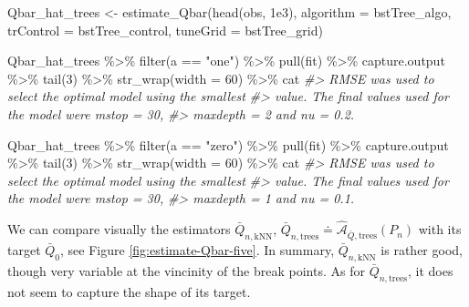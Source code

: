 \documentclass[
  11pt,
  openright,twoside]{book}
\newenvironment{Shaded}{\begin{snugshade}}{\end{snugshade}}
\newcommand{\AttributeTok}[1]{\textcolor[rgb]{0.77,0.63,0.00}{#1}}
\newcommand{\CommentTok}[1]{\textcolor[rgb]{0.56,0.35,0.01}{\textit{#1}}}
\newcommand{\DecValTok}[1]{\textcolor[rgb]{0.00,0.00,0.81}{#1}}
\newcommand{\FloatTok}[1]{\textcolor[rgb]{0.00,0.00,0.81}{#1}}
\newcommand{\FunctionTok}[1]{\textcolor[rgb]{0.00,0.00,0.00}{#1}}
\newcommand{\NormalTok}[1]{#1}
\newcommand{\OtherTok}[1]{\textcolor[rgb]{0.56,0.35,0.01}{#1}}
\newcommand{\SpecialCharTok}[1]{\textcolor[rgb]{0.00,0.00,0.00}{#1}}
\newcommand{\StringTok}[1]{\textcolor[rgb]{0.31,0.60,0.02}{#1}}
\newcommand{\Algo}{\widehat{\mathcal{A}}}
\newcommand{\defq}{\doteq}
\newcommand{\Qbar}{\bar{Q}}
\theoremstyle{definition}
\theoremstyle{definition}
\theoremstyle{definition}
\theoremstyle{definition}
\theoremstyle{remark}
\begin{document}
\begin{Shaded}
\begin{Highlighting}[]
\NormalTok{Qbar\_hat\_trees }\OtherTok{\textless{}{-}} \FunctionTok{estimate\_Qbar}\NormalTok{(}\FunctionTok{head}\NormalTok{(obs, }\FloatTok{1e3}\NormalTok{),}
                                \AttributeTok{algorithm =}\NormalTok{ bstTree\_algo,}
                                \AttributeTok{trControl =}\NormalTok{ bstTree\_control,}
                                \AttributeTok{tuneGrid =}\NormalTok{ bstTree\_grid)}

\NormalTok{Qbar\_hat\_trees }\SpecialCharTok{\%\textgreater{}\%} \FunctionTok{filter}\NormalTok{(a }\SpecialCharTok{==} \StringTok{"one"}\NormalTok{) }\SpecialCharTok{\%\textgreater{}\%} \FunctionTok{pull}\NormalTok{(fit) }\SpecialCharTok{\%\textgreater{}\%}
\NormalTok{  capture.output }\SpecialCharTok{\%\textgreater{}\%} \FunctionTok{tail}\NormalTok{(}\DecValTok{3}\NormalTok{) }\SpecialCharTok{\%\textgreater{}\%} \FunctionTok{str\_wrap}\NormalTok{(}\AttributeTok{width =} \DecValTok{60}\NormalTok{) }\SpecialCharTok{\%\textgreater{}\%}\NormalTok{ cat}
\CommentTok{\#\textgreater{} RMSE was used to select the optimal model using the smallest}
\CommentTok{\#\textgreater{} value. The final values used for the model were mstop = 30,}
\CommentTok{\#\textgreater{} maxdepth = 2 and nu = 0.2.}
                                                             
\NormalTok{Qbar\_hat\_trees }\SpecialCharTok{\%\textgreater{}\%} \FunctionTok{filter}\NormalTok{(a }\SpecialCharTok{==} \StringTok{"zero"}\NormalTok{) }\SpecialCharTok{\%\textgreater{}\%} \FunctionTok{pull}\NormalTok{(fit) }\SpecialCharTok{\%\textgreater{}\%}
\NormalTok{  capture.output }\SpecialCharTok{\%\textgreater{}\%} \FunctionTok{tail}\NormalTok{(}\DecValTok{3}\NormalTok{) }\SpecialCharTok{\%\textgreater{}\%} \FunctionTok{str\_wrap}\NormalTok{(}\AttributeTok{width =} \DecValTok{60}\NormalTok{) }\SpecialCharTok{\%\textgreater{}\%}\NormalTok{ cat}
\CommentTok{\#\textgreater{} RMSE was used to select the optimal model using the smallest}
\CommentTok{\#\textgreater{} value. The final values used for the model were mstop = 30,}
\CommentTok{\#\textgreater{} maxdepth = 1 and nu = 0.1.}
\end{Highlighting}
\end{Shaded}

We can compare visually the estimators \(\Qbar_{n,\text{kNN}}\),
\(\Qbar_{n,\text{trees}} \defq \Algo_{\Qbar,\text{trees}}(P_{n})\) with its
target \(\Qbar_0\), see Figure \ref{fig:estimate-Qbar-five}. In summary,
\(\Qbar_{n,\text{kNN}}\) is rather good, though very variable at the vincinity
of the break points. As for \(\Qbar_{n,\text{trees}}\), it does not seem to
capture the shape of its target.
\end{document}

